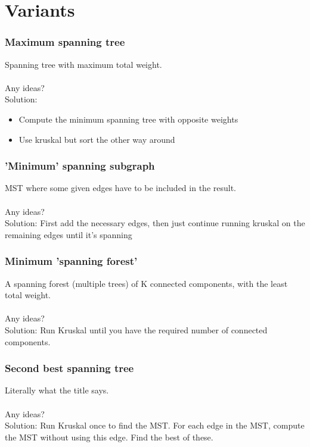 \documentclass[12pt]{beamer}
\begin{document}
\section{Variants}

\begin{frame}
	\frametitle{Maximum spanning tree}
	Spanning tree with maximum total weight.\\~\\
	Any ideas?\\
	\pause
	Solution: 
	\begin{itemize}
		\item Compute the minimum spanning tree with opposite weights
		\item Use kruskal but sort the other way around
	\end{itemize}
	
\end{frame}

\begin{frame}
	\frametitle{'Minimum' spanning subgraph}
	MST where some given edges have to be included in the result.\\~\\
	Any ideas?\\
	\pause
	Solution: First add the necessary edges, then just continue running kruskal on the remaining edges until it's spanning
	
\end{frame}

\begin{frame}
	\frametitle{Minimum 'spanning forest'}
	A spanning forest (multiple trees) of K connected components, with the least total weight.\\~\\
	Any ideas?\\
	\pause
	Solution: Run Kruskal until you have the required number of connected components.
	
\end{frame}

\begin{frame}
	\frametitle{Second best spanning tree}
	Literally what the title says.\\~\\
	Any ideas?\\
	\pause
	Solution: Run Kruskal once to find the MST. For each edge in the MST, compute the MST without using this edge. Find the best of these.
	
\end{frame}
\end{document}
